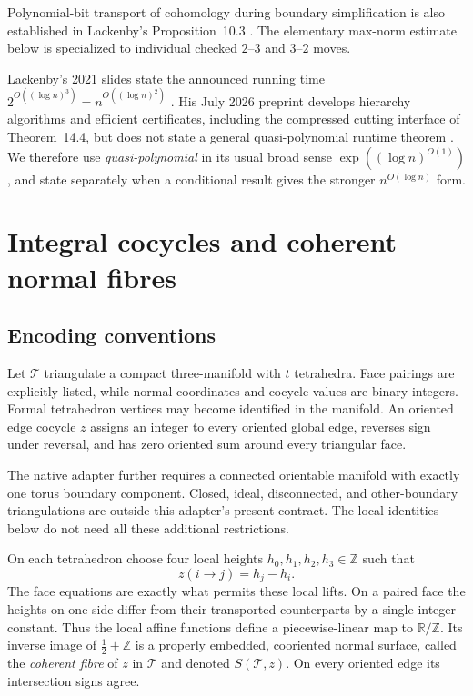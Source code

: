 \documentclass[11pt,letterpaper]{article}
\theoremstyle{definition}
\theoremstyle{remark}
\newcommand{\Z}{\mathbb Z}
\newcommand{\R}{\mathbb R}
\begin{document}
Polynomial-bit transport of cohomology during boundary simplification is
also established in Lackenby's Proposition~10.3
\cite{LackenbyCertification}. The elementary max-norm estimate below is
specialized to individual checked $2$--$3$ and $3$--$2$ moves.

Lackenby's 2021 slides state the announced running time
$2^{O((\log n)^3)}=n^{O((\log n)^2)}$ \cite{LackenbySlides}. His July 2026
preprint develops hierarchy algorithms and efficient certificates, including
the compressed cutting interface of Theorem~14.4, but does not state a
general quasi-polynomial runtime theorem \cite{Lackenby2026}. We therefore
use \emph{quasi-polynomial} in its usual broad sense
$\exp((\log n)^{O(1)})$, and state separately when a conditional result gives
the stronger $n^{O(\log n)}$ form.

\section{Integral cocycles and coherent normal fibres}
\label{sec:cochains}

\subsection{Encoding conventions}

Let $\mathcal T$ triangulate a compact three-manifold with $t$ tetrahedra.
Face pairings
are explicitly listed, while normal coordinates and cocycle values are
binary integers. Formal tetrahedron vertices may become identified in the
manifold. An oriented edge cocycle $z$ assigns an integer to every oriented
global edge, reverses sign under reversal, and has zero oriented sum around
every triangular face.

The native adapter further requires a connected orientable manifold with
exactly one torus boundary component. Closed, ideal, disconnected, and
other-boundary triangulations are outside this adapter's present contract.
The local identities below do not need all these additional restrictions.

On each tetrahedron choose four local heights
$h_0,h_1,h_2,h_3\in\Z$ such that
\[
 z(i\to j)=h_j-h_i.
\]
The face equations are exactly what permits these local lifts. On a paired
face the heights on one side differ from their transported counterparts by
a single integer constant. Thus the local affine functions define a
piecewise-linear map to $\R/\Z$. Its inverse image of
$\tfrac12+\Z$ is a properly embedded, cooriented normal surface, called
the \emph{coherent fibre} of $z$ in $\mathcal T$ and denoted $S(\mathcal T,z)$.
On every oriented edge its intersection signs agree.
\end{document}
